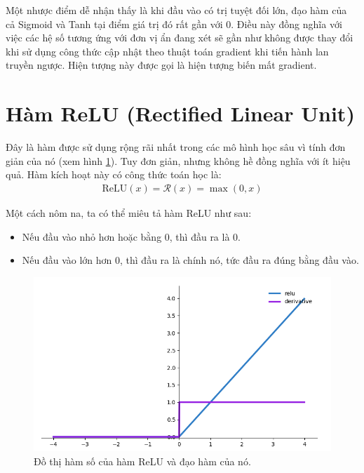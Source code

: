 Một nhược điểm dễ nhận thấy là khi đầu vào có trị tuyệt đối lớn, đạo hàm của cả Sigmoid và Tanh tại điểm giá trị đó rất gần với 0.
Điều này đồng nghĩa với việc các hệ số tương ứng với đơn vị ẩn đang xét sẽ gần như không được thay đổi khi sử dụng công thức cập nhật theo thuật toán gradient khi tiến hành lan truyền ngược.
Hiện tượng này được gọi là hiện tượng biến mất gradient.

\section{Hàm ReLU (Rectified Linear Unit)}\label{sec:hamrelu}

Đây là hàm \cite{reluhinton} được sử dụng rộng rãi nhất trong các mô hình học sâu vì tính đơn giản của nó (xem hình \ref{fig:relufunc}).
Tuy đơn giản, nhưng không hề đồng nghĩa với ít hiệu quả.
Hàm kích hoạt này có công thức toán học là:
\begin{align}
    \text{ReLU}(x) = \mathcal{R}(x) = \max\left(0, x\right)
\end{align}

Một cách nôm na, ta có thể miêu tả hàm ReLU như sau:
\begin{itemize}
    \item Nếu đầu vào nhỏ hơn hoặc bằng 0, thì đầu ra là 0.
    \item Nếu đầu vào lớn hơn 0, thì đầu ra là chính nó, tức đầu ra đúng bằng đầu vào.
\end{itemize}

\begin{figure}[!h]
\captionsetup{width=0.8\textwidth}
\centering
\includegraphics[width=15cm]{images/relufunc.PNG}
\caption{Đồ thị hàm số của hàm ReLU và đạo hàm của nó.}
\label{fig:relufunc}
\end{figure}

